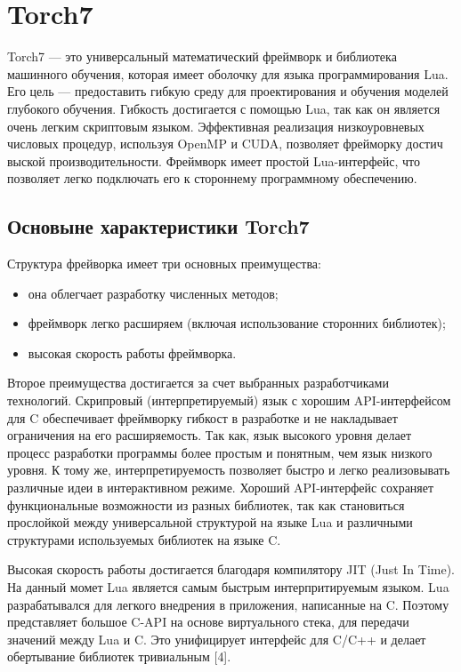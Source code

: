 \documentclass[a4paper,english,russian]{G2-105}
\begin{document}
\section{Torch7}
\par Torch7 --- это универсальный математический фреймворк и библиотека машинного обучения, которая имеет оболочку для языка программирования Lua. Его цель --- предоставить гибкую среду для проектирования и обучения моделей глубокого обучения. Гибкость достигается с помощью Lua, так как он является очень легким скриптовым языком. Эффективная реализация низкоуровневых числовых процедур, используя OpenMP и CUDA, позволяет фрейморку достич выской производительности. Фреймворк имеет простой Lua-интерфейс, что позволяет легко подключать его к стороннему программному обеспечению.
\subsection{Основыне характеристики Torch7}
\par Структура фрейворка имеет три основных преимущества:
\begin{itemize}
\item она облегчает разработку численных методов;
\item фреймворк легко расширяем (включая использование сторонних библиотек);
\item высокая скорость работы фреймворка.
\end{itemize}
\par Второе преимущества достигается за счет выбранных разработчиками технологий. Скрипровый (интерпретируемый) язык с хорошим API-интерфейсом для C обеспечивает фреймворку гибкост в разработке и не накладывает ограничения на его расширяемость. Так как, язык высокого уровня делает процесс разработки программы более простым и понятным, чем язык низкого уровня. К тому же, интерпретируемость позволяет быстро и легко реализовывать различные идеи в интерактивном режиме. Хороший API-интерфейс сохраняет функциональные возможности из разных библиотек, так как становиться прослойкой между универсальной структурой на языке Lua и различными структурами используемых библиотек на языке C.
\par Высокая скорость работы достигается благодаря компилятору JIT (Just In Time). На данный момет Lua является самым быстрым интерпритируемым языком. Lua разрабатывался для легкого внедрения в приложения, написанные на C. Поэтому представляет большое C-API на основе виртуального стека, для передачи значений между Lua и C. Это унифицирует интерфейс для C/C++ и делает обертывание библиотек тривиальным [4].
\end{document}
